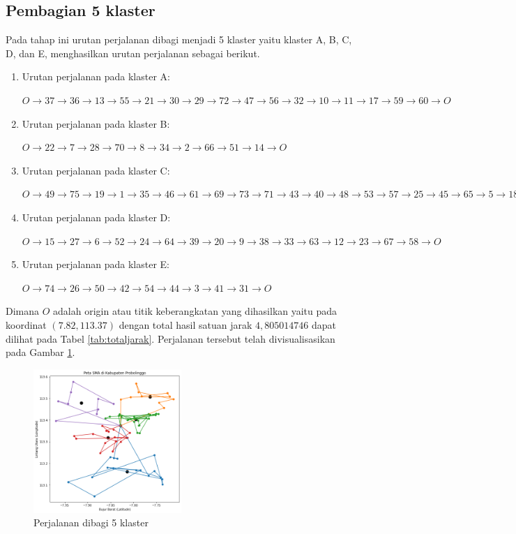 \subsection{Pembagian 5 klaster}

Pada tahap ini urutan perjalanan dibagi menjadi 5 klaster yaitu klaster A, B, C, D, dan E, menghasilkan urutan perjalanan sebagai berikut.

\begin{enumerate}

\item Urutan perjalanan pada klaster A:

$O \to 37 \to 36 \to 13 \to 55 \to 21 \to 30 \to 29 \to 72 \to 47 \to 56 \to 32 \to 10 \to 11 \to 17 \to 59 \to 60 \to O$

\item Urutan perjalanan pada klaster B:

$O \to 22 \to 7 \to 28 \to 70 \to 8 \to 34 \to 2 \to 66 \to 51 \to 14 \to O$

\item Urutan perjalanan pada klaster C:

$O \to 49 \to 75 \to 19 \to 1 \to 35 \to 46 \to 61 \to 69 \to 73 \to 71 \to 43 \to 40 \to 48 \to 53 \to 57 \to 25 \to 45 \to 65 \to 5 \to 18 \to 68 \to 16 \to 4 \to 62 \to O$

\item Urutan perjalanan pada klaster D:

$O \to 15 \to 27 \to 6 \to 52 \to 24 \to 64 \to 39 \to 20 \to 9 \to 38 \to 33 \to 63 \to 12 \to 23 \to 67 \to 58 \to O$

\item Urutan perjalanan pada klaster E:

$O \to 74 \to 26 \to 50 \to 42 \to 54 \to 44 \to 3 \to 41 \to 31 \to O$

\end{enumerate}

Dimana $O$ adalah origin atau titik keberangkatan yang dihasilkan yaitu pada koordinat $(7.82, 113.37)$ dengan total hasil satuan jarak $4,805014746$ dapat dilihat pada Tabel \ref{tab:totaljarak}. Perjalanan tersebut telah divisualisasikan pada Gambar \ref{fig:hasil_mtsp5}.

\begin{figure}[H]
\centering
\includegraphics[width=0.5\textwidth]{Gambar/hasil_mtsp/5}
\caption{Perjalanan dibagi 5 klaster}
\label{fig:hasil_mtsp5}
\end{figure}

